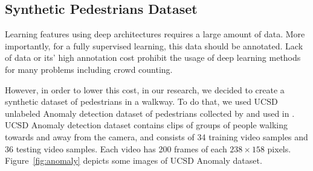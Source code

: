 


\subsection{Synthetic Pedestrians Dataset}
\label{subsec:synped}

Learning features using deep architectures requires a large amount of data. More importantly, for a fully supervised learning, this data should be annotated. Lack of data or its' high annotation cost prohibit the usage of deep learning methods for many problems including crowd counting. 

\indent However, in order to lower this cost, in our research, we decided to create a synthetic dataset of pedestrians in a walkway. To do that, we used UCSD unlabeled Anomaly detection dataset of pedestrians collected by \citeauthor{chan2008privacy} and used in \cite{chan2009analysis, mahadevan2010anomaly, li2014anomaly}. UCSD Anomaly detection dataset contains clips of groups of people walking towards and away from the camera, and consists of 34 training video samples and 36 testing video samples. Each video has 200 frames of each $238\times158$ pixels. Figure~\ref{fig:anomaly} depicts some images of UCSD Anomaly dataset.

